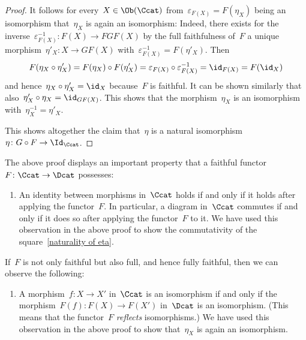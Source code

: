\begin{proof}
  It follows for every~$X \in \Ob(\Ccat)$ from~$\varepsilon_{F(X)} = F(\eta_X)$ being an isomorphism that~$\eta_X$ is again an isomorphism:
  Indeed, there exists for the inverse~$\varepsilon_{F(X)}^{-1} \colon F(X) \to FGF(X)$ by the full faithfulness of~$F$ a unique morphism~$\eta'_X \colon X \to GF(X)$ with~$\varepsilon_{F(X)}^{-1} = F(\eta'_X)$.
  Then
  \[
      F(\eta_X \circ \eta'_X)
    = F(\eta_X) \circ F(\eta'_X)
    = \varepsilon_{F(X)} \circ \varepsilon_{F(X)}^{-1}
    = \id_{F(X)}
    = F(\id_X)
  \]
  and hence~$\eta_X \circ \eta'_X = \id_X$ because~$F$ is faithful.
  It can be shown similarly that also~$\eta'_X \circ \eta_X = \id_{GF(X)}$.
  This shows that the morphism~$\eta_X$ is an isomorphism with~$\eta_X^{-1} = \eta'_X$.
  
  This shows altogether the claim that~$\eta$ is a natural isomorphism~$\eta \colon G \circ F \to \Id_\Ccat$.
\end{proof}


\begin{remark*}
  The above proof displays an important property that a faithful functor~$F \colon \Ccat \to \Dcat$ possesses:
  \begin{enumerate}
    \item
      An identity between morphisms in~$\Ccat$ holds if and only if it holds after applying the functor~$F$.
      In particular, a diagram in~$\Ccat$ commutes if and only if it does so after applying the functor~$F$ to it.
      We have used this observation in the above proof to show the commutativity of the square~\eqref{naturality of eta}.
  \end{enumerate}
  If~$F$ is not only faithful but also full, and hence fully faithful, then we can observe the following:
  \begin{enumerate}[resume]
    \item
      A morphism~$f \colon X \to X'$ in~$\Ccat$ is an isomorphism if and only if the morphism~$F(f) \colon F(X) \to F(X')$ in~$\Dcat$ is an isomorphism.
      (This means that the functor~$F$ \emph{reflects} isomorphisms.)
      We have used this observation in the above proof to show that~$\eta_X$ is again an isomorphism.
  \end{enumerate}
\end{remark*}


